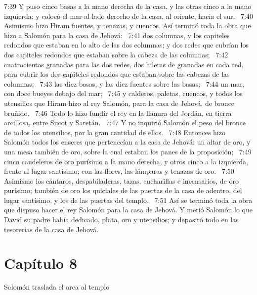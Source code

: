7:39 Y puso cinco basas a la mano derecha de la casa, y las otras cinco a la mano izquierda; y colocó el mar al lado derecho de la casa, al oriente, hacia el sur.  
7:40 Asimismo hizo Hiram fuentes, y tenazas, y cuencos. Así terminó toda la obra que hizo a Salomón para la casa de Jehová:  
7:41 dos columnas, y los capiteles redondos que estaban en lo alto de las dos columnas; y dos redes que cubrían los dos capiteles redondos que estaban sobre la cabeza de las columnas;  
7:42 cuatrocientas granadas para las dos redes, dos hileras de granadas en cada red, para cubrir los dos capiteles redondos que estaban sobre las cabezas de las columnas;  
7:43 las diez basas, y las diez fuentes sobre las basas;  
7:44 un mar, con doce bueyes debajo del mar;  
7:45 y calderos, paletas, cuencos, y todos los utensilios que Hiram hizo al rey Salomón, para la casa de Jehová, de bronce bruñido.  
7:46 Todo lo hizo fundir el rey en la llanura del Jordán, en tierra arcillosa, entre Sucot y Saretán.  
7:47 Y no inquirió Salomón el peso del bronce de todos los utensilios, por la gran cantidad de ellos.  
7:48 Entonces hizo Salomón todos los enseres que pertenecían a la casa de Jehová: un altar de oro, y una mesa también de oro, sobre la cual estaban los panes de la proposición;  
7:49 cinco candeleros de oro purísimo a la mano derecha, y otros cinco a la izquierda, frente al lugar santísimo; con las flores, las lámparas y tenazas de oro.  
7:50 Asimismo los cántaros, despabiladeras, tazas, cucharillas e incensarios, de oro purísimo; también de oro los quiciales de las puertas de la casa de adentro, del lugar santísimo, y los de las puertas del templo.  
7:51 Así se terminó toda la obra que dispuso hacer el rey Salomón para la casa de Jehová. Y metió Salomón lo que David su padre había dedicado,  plata, oro y utensilios; y depositó todo en las tesorerías de la casa de Jehová.  
\section*{Capítulo 8 }
Salomón traslada el arca al templo  


